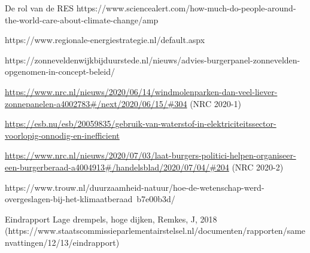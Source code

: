 \begin{voorstel}{De rol van de RES}
https://www.sciencealert.com/how-much-do-people-around-the-world-care-about-climate-change/amp

https://www.regionale-energiestrategie.nl/default.aspx

https://zonneveldenwijkbijduurstede.nl/nieuws/advies-burgerpanel-zonnevelden-opgenomen-in-concept-beleid/

\url{https://www.nrc.nl/nieuws/2020/06/14/windmolenparken-dan-veel-liever-zonnepanelen-a4002783#/next/2020/06/15/#304} (NRC 2020-1)

\url{https://esb.nu/esb/20059835/gebruik-van-waterstof-in-elektriciteitssector-voorlopig-onnodig-en-inefficient}

\url{https://www.nrc.nl/nieuws/2020/07/03/laat-burgers-politici-helpen-organiseer-een-burgerberaad-a4004913#/handelsblad/2020/07/04/#204} (NRC 2020-2)

https://www.trouw.nl/duurzaamheid-natuur/hoe-de-wetenschap-werd-overgeslagen-bij-het-klimaatberaad~b7e00b3d/

Eindrapport Lage drempels, hoge dijken, Remkes, J, 2018 (https://www.staatscommissieparlementairstelsel.nl/documenten/rapporten/samenvattingen/12/13/eindrapport)


\end{voorstel}
